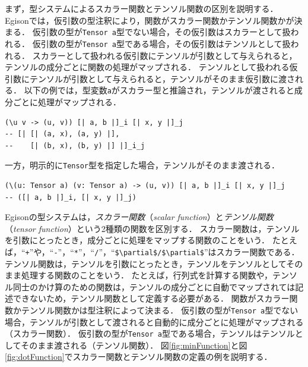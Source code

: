 まず，型システムによるスカラー関数とテンソル関数の区別を説明する．
Egisonでは，仮引数の型注釈により，関数がスカラー関数かテンソル関数かが決まる．
仮引数の型が\lstinline{Tensor a}型でない場合，その仮引数はスカラーとして扱われる．
仮引数の型が\lstinline{Tensor a}型である場合，その仮引数はテンソルとして扱われる．
スカラーとして扱われる仮引数にテンソルが引数として与えられると，テンソルの成分ごとに関数の処理がマップされる．
テンソルとして扱われる仮引数にテンソルが引数として与えられると，テンソルがそのまま仮引数に渡される．
以下の例では，型変数\lstinline{a}がスカラー型と推論され，テンソルが渡されると成分ごとに処理がマップされる．
\begin{lstlisting}[language=egison,numbers=none]
(\u v -> (u, v)) [| a, b |]_i [| x, y |]_j
-- [| [| (a, x), (a, y) |],
--    [| (b, x), (b, y) |] |]_i_j
\end{lstlisting}
一方，明示的に\lstinline{Tensor}型を指定した場合，テンソルがそのまま渡される．
\begin{lstlisting}[language=egison,numbers=none]
(\(u: Tensor a) (v: Tensor a) -> (u, v)) [| a, b |]_i [| x, y |]_j
-- ([| a, b |]_i, [| x, y |]_j)
\end{lstlisting}

Egisonの型システムは，\emph{スカラー関数}（\emph{scalar function}）と\emph{テンソル関数}（\emph{tensor function}）という2種類の関数を区別する．
スカラー関数は，テンソルを引数にとったとき，成分ごとに処理をマップする関数のことをいう．
たとえば，``\lstinline|+|''や，``\lstinline|-|''，``\lstinline|*|''，``\lstinline|/|''，``\lstinline[mathescape]!$\partial$/$\partial$!''はスカラー関数である．
テンソル関数は，テンソルを引数にとったとき，テンソルをテンソルとしてそのまま処理する関数のことをいう．
たとえば，行列式を計算する関数や，テンソル同士のかけ算のための関数は，テンソルの成分ごとに自動でマップされては記述できないため，テンソル関数として定義する必要がある．
関数がスカラー関数かテンソル関数かは型注釈によって決まる．
仮引数の型が\lstinline{Tensor a}型でない場合，テンソルが引数として渡されると自動的に成分ごとに処理がマップされる（スカラー関数）．
仮引数の型が\lstinline{Tensor a}型である場合，テンソルはテンソルとしてそのまま渡される（テンソル関数）．
図\ref{fig:minFunction}と図\ref{fig:dotFunction}でスカラー関数とテンソル関数の定義の例を説明する．

